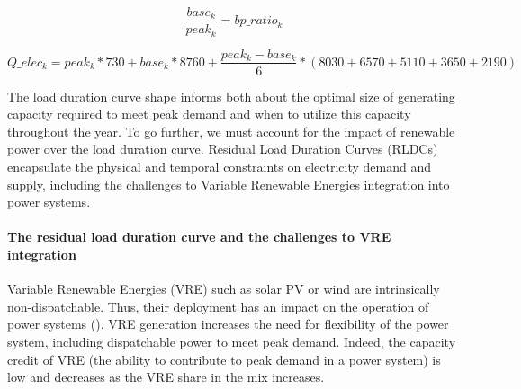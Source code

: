 \begin{dmath}
    \frac{base_k}{peak_k} = bp\_ratio_k
    \label{eqn:elecBpRatio}
\end{dmath}

\begin{dmath}
        Q\_elec_k =
        peak_k * 730 +
        base_k * 8760 + \frac{peak_k - base_k}{6} * ( 8030 + 6570 + 5110 + 3650 + 2190) 
    \label{eqn:elecQ}
\end{dmath}

The load duration curve shape informs both about the optimal size of generating capacity required to meet peak demand and when to utilize this capacity throughout the year. To go further, we must account for the impact of renewable power over the load duration curve. Residual Load Duration Curves (RLDCs) encapsulate the physical and temporal constraints on electricity demand and supply, including the challenges to Variable Renewable Energies integration into power systems. 

 \paragraph{The residual load duration curve and the challenges to VRE integration }

 Variable Renewable Energies (VRE) such as solar PV or wind are intrinsically non-dispatchable. Thus, their deployment has an impact on the operation of power systems (\cite{Hirth2015}). VRE generation increases the need for flexibility of the power system, including dispatchable power to meet peak demand. Indeed, the capacity credit of VRE (the ability to contribute to peak demand in a power system) is low and decreases as the VRE share in the mix increases. 
 

